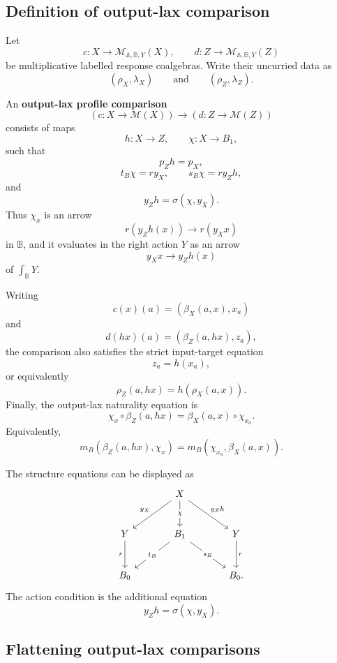 \subsection{Definition of output-lax comparison}
\label{subsec:poly-relative-output-lax-comparison-definition}

Let
\[
c:X\to\mathcal M_{\mathbb A,\mathbb B,Y}(X),
\qquad
d:Z\to\mathcal M_{\mathbb A,\mathbb B,Y}(Z)
\]
be multiplicative labelled response coalgebras.  Write their uncurried data as
\[
(\rho_X,\lambda_X)
\qquad\text{and}\qquad
(\rho_Z,\lambda_Z).
\]

\begin{definition}
\label{def:poly-relative-output-lax-profile-comparison}
An \textbf{output-lax profile comparison}
\[
(c:X\to\mathcal M(X))
\longrightarrow
(d:Z\to\mathcal M(Z))
\]
consists of maps
\[
h:X\to Z,
\qquad
\chi:X\to B_1,
\]
such that
\[
p_Zh=p_X,
\]
\[
t_B\chi=r y_X,
\qquad
s_B\chi=r y_Zh,
\]
and
\[
y_Zh=\sigma(\chi,y_X).
\]
Thus \(\chi_x\) is an arrow
\[
r(y_Zh(x))\longrightarrow r(y_Xx)
\]
in \(\mathbb B\), and it evaluates in the right action \(Y\) as an arrow
\[
y_Xx\longrightarrow y_Zh(x)
\]
of \(\int_{\mathbb B}Y\).

Writing
\[
c(x)(a)=(\beta_X(a,x),x_a)
\]
and
\[
d(hx)(a)=(\beta_Z(a,hx),z_a),
\]
the comparison also satisfies the strict input-target equation
\[
z_a=h(x_a),
\]
or equivalently
\[
\rho_Z(a,hx)=h(\rho_X(a,x)).
\]
Finally, the output-lax naturality equation is
\[
\chi_x\circ \beta_Z(a,hx)
=
\beta_X(a,x)\circ \chi_{x_a}.
\]
Equivalently,
\[
m_B(\beta_Z(a,hx),\chi_x)
=
m_B(\chi_{x_a},\beta_X(a,x)).
\]
\end{definition}

The structure equations can be displayed as
\[
\begin{tikzcd}[column sep=large,row sep=large]
&
X
  \arrow[dl,"y_X"']
  \arrow[dr,"y_Zh"]
  \arrow[d,"\chi" description]
&
\\
Y
  \arrow[d,"r"']
&
B_1
  \arrow[dl,"t_B" description]
  \arrow[dr,"s_B" description]
&
Y
  \arrow[d,"r"]
\\
B_0
&&
B_0 .
\end{tikzcd}
\]
The action condition is the additional equation
\[
y_Zh=\sigma(\chi,y_X).
\]

\subsection{Flattening output-lax comparisons}
\label{subsec:poly-relative-flatten-output-lax-comparisons}

